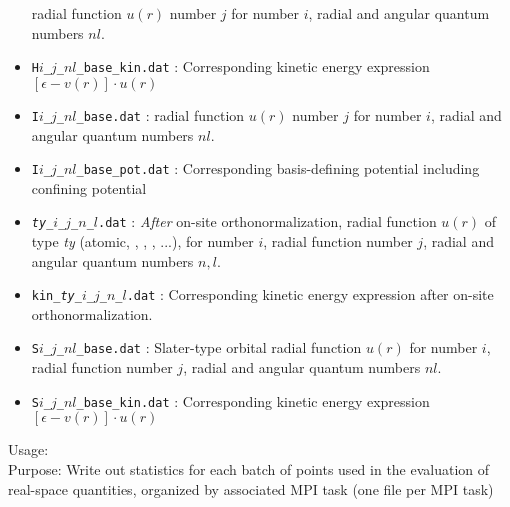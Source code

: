 \begin{itemize}
     radial function $u(r)$
      number $j$ for  number $i$, radial and angular
      quantum numbers $nl$.
  \item \texttt{H$i$\_$j$\_$nl$\_base\_kin.dat} : Corresponding
    kinetic energy expression $[\epsilon - v(r)]\cdot u(r)$
  \item \texttt{I$i$\_$j$\_$nl$\_base.dat} :
     radial function $u(r)$
      number $j$ for  number $i$, radial and angular
      quantum numbers $nl$.
  \item \texttt{I$i$\_$j$\_$nl$\_base\_pot.dat} : Corresponding
    basis-defining potential including confining potential
  \item \texttt{\emph{ty}\_$i$\_$j$\_$n$\_$l$.dat} : \emph{After}
    on-site orthonormalization, radial function $u(r)$ of type
    \emph{ty} (atomic, ,
    , , ...),
    for  number $i$, radial function number $j$,
    radial and angular quantum numbers $n,l$.
  \item \texttt{kin\_\emph{ty}\_$i$\_$j$\_$n$\_$l$.dat} :
    Corresponding kinetic energy expression after on-site
    orthonormalization.
  \item \texttt{S$i$\_$j$\_$nl$\_base.dat} : Slater-type orbital
    radial function $u(r)$ for  number $i$, radial
    function number $j$, radial and angular quantum numbers $nl$.
  \item \texttt{S$i$\_$j$\_$nl$\_base\_kin.dat} : Corresponding
    kinetic energy expression $[\epsilon - v(r)]\cdot u(r)$
\end{itemize}

{
  \noindent
  Usage:   \\[1.0ex]
  Purpose: Write out statistics for each batch of points used in the evaluation of
           real-space quantities, organized by associated MPI task (one file per MPI
           task) \\[1.0ex]
}

